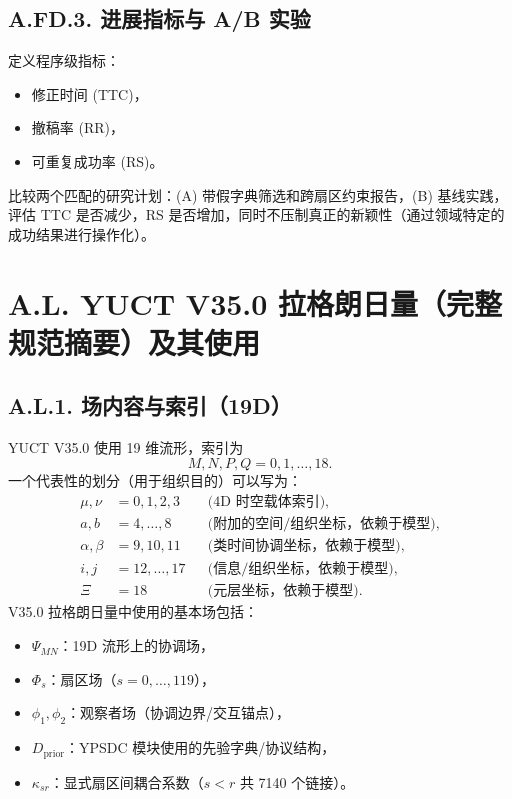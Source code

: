 \documentclass[11pt,a4paper]{article}
\newcommand{\Dprior}{D_{\mathrm{prior}}}
\begin{document}
	\subsection*{A.FD.3. 进展指标与 A/B 实验}
	定义程序级指标：
	\begin{itemize}[leftmargin=*]
		\item 修正时间 (TTC)，
		\item 撤稿率 (RR)，
		\item 可重复成功率 (RS)。
	\end{itemize}
	比较两个匹配的研究计划：(A) 带假字典筛选和跨扇区约束报告，(B) 基线实践，评估 TTC 是否减少，RS 是否增加，同时不压制真正的新颖性（通过领域特定的成功结果进行操作化）。
	
	\section*{A.L. YUCT V35.0 拉格朗日量（完整规范摘要）及其使用}
	
	\subsection*{A.L.1. 场内容与索引（19D）}
	YUCT V35.0 使用 19 维流形，索引为
	\[
	M,N,P,Q=0,1,\dots,18.
	\]
	一个代表性的划分（用于组织目的）可以写为：
	\begin{align*}
		\mu,\nu &= 0,1,2,3 &&\text{(4D 时空载体索引)},\\
		a,b &= 4,\dots,8 &&\text{(附加的空间/组织坐标，依赖于模型)},\\
		\alpha,\beta &= 9,10,11 &&\text{(类时间协调坐标，依赖于模型)},\\
		i,j &= 12,\dots,17 &&\text{(信息/组织坐标，依赖于模型)},\\
		\Xi &= 18 &&\text{(元层坐标，依赖于模型)}.
	\end{align*}
	V35.0 拉格朗日量中使用的基本场包括：
	\begin{itemize}[leftmargin=*]
		\item $\Psi_{MN}$：19D 流形上的协调场，
		\item $\Phi_s$：扇区场（$s=0,\dots,119$），
		\item $\phi_1,\phi_2$：观察者场（协调边界/交互锚点），
		\item $\Dprior$：YPSDC 模块使用的先验字典/协议结构，
		\item $\kappa_{sr}$：显式扇区间耦合系数（$s<r$ 共 7140 个链接）。
	\end{itemize}
	
\end{document}
